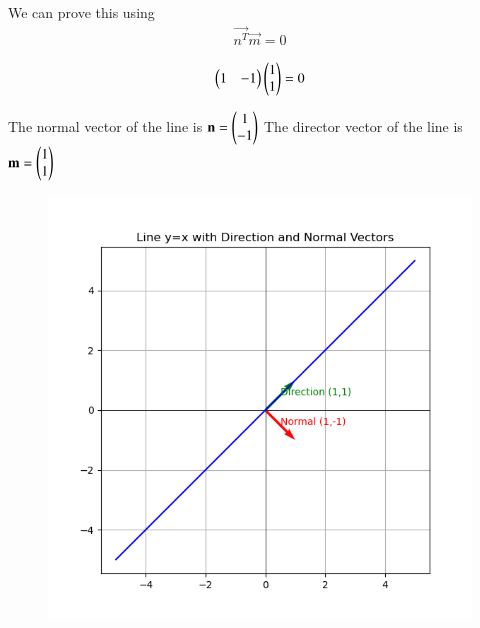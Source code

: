 \documentclass[journal]{IEEEtran}
\begin{document}
We can prove this using
\begin{align}
\vec{n^T}\vec{m} = 0
\end{align}

\begin{align}
\begin{pmatrix}1 & -1\end{pmatrix}\begin{pmatrix}1 \\ 1\end{pmatrix} = 0
\end{align}

The normal vector of the line is $\mathbf{n} = \begin{pmatrix}1 \\ -1\end{pmatrix}$
The director vector of the line is $\mathbf{m} = \begin{pmatrix}1 \\ 1\end{pmatrix}$\\

\begin{figure}[ht!]
\centering
\includegraphics[height=0.6\textheight, keepaspectratio]{figs/q6.png}
\end{figure}
\end{document}
